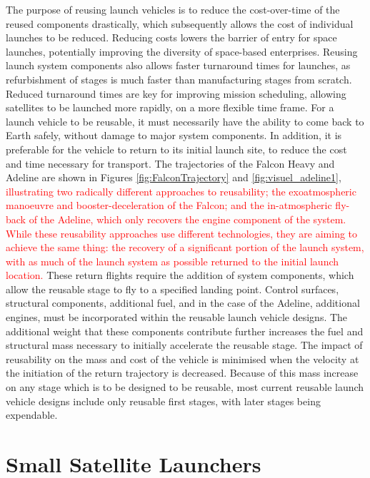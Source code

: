     The purpose of reusing launch vehicles is to reduce the cost-over-time of the reused components drastically, which subsequently allows the cost of individual launches to be reduced\cite{RichardWebb2016}. Reducing costs lowers the barrier of entry for space launches, potentially improving the diversity of space-based enterprises. 
    Reusing launch system components also allows faster turnaround times for launches, as refurbishment of stages is much faster than manufacturing stages from scratch. Reduced turnaround times are key for improving mission scheduling, allowing satellites to be launched more rapidly, on a more flexible time frame. 
    For a launch vehicle to be reusable, it must necessarily have the ability to come back to Earth safely, without damage to major system components. In addition, it is preferable for the vehicle to return to its initial launch site, to reduce the cost and time necessary for transport. The trajectories of the Falcon Heavy and Adeline are shown in Figures \ref{fig:FalconTrajectory} and \ref{fig:visuel_adeline1}, \textcolor{red}{ illustrating two radically different approaches to reusability; the exoatmospheric manoeuvre and booster-deceleration of the Falcon; and the in-atmospheric fly-back of the Adeline, which only recovers the engine component of the system. While these reusability approaches use different technologies, they are aiming to achieve the same thing: the recovery of a significant portion of the launch system, with as much of the launch system as possible returned to the initial launch location.} These return flights require the addition of system components, which allow the reusable stage to fly to a specified landing point. Control surfaces\cite{Clark2018}, structural components\cite{Sarigul2003}, additional fuel\cite{Sarigul2003}, and in the case of the Adeline, additional engines\cite{Adeline}, must be incorporated within the reusable launch vehicle designs. The additional weight that these components contribute further increases the fuel and structural mass necessary to initially accelerate the reusable stage. The impact of reusability on the mass and cost of the vehicle is minimised when the velocity at the initiation of the return trajectory is decreased. Because of this mass increase on any stage which is to be designed to be reusable, most current reusable launch vehicle designs include only reusable first stages, with later stages being expendable. 
    
    
    
    
    \section{Small Satellite Launchers}\label{subsec:smallsats}
    
